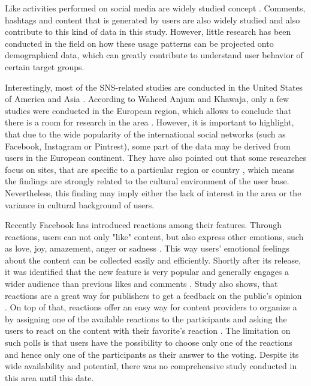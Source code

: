 Like activities performed on social media are widely studied concept \cite{bakhshi2014faces, jang2015noreciprocity, jang2016teensengagemorewithfewerphotos, ottoni2013ladies}. Comments, hashtags and content that is generated by users are also widely studied \cite{bakhshi2014faces, jang2016teensengagemorewithfewerphotos, hu2014we, bakhshi2014faces} and also contribute to this kind of data in this study. However, little research has been conducted in the field on how these usage patterns can be projected onto demographical data, which can greatly contribute to understand user behavior of certain target groups. 

Interestingly, most of the SNS-related studies are conducted in the United States of America and Asia \cite{waheed2017investigation}. According to Waheed
Anjum and Khawaja, only a few studies were conducted in the European region, which allows to conclude that there is a room for research in the area \cite{waheed2017investigation}. However, it is important to highlight, that due to the wide popularity of the international social networks (such as Facebook, Instagram or Pintrest), some part of the data may be derived from users in the European continent. They have also pointed out that some researches focus on sites, that are specific to a particular region or country \cite{waheed2017investigation}, which means the findings are strongly related to the cultural environment of the user base. Nevertheless, this finding may imply either the lack of interest in the area or the variance in cultural background of users. 

Recently Facebook has introduced reactions among their features. Through reactions, users can not only "like" content, but also express other emotions, such as love, joy, amazement, anger or sadness \cite{shouldfacebookusereactions, howarenewspublishersreactingonfacebook}. This way users' emotional feelings about the content can be collected easily and efficiently. Shortly after its release, it was identified that the new feature is very popular and generally engages a wider audience than previous likes and comments \cite{shouldfacebookusereactions}. Study also shows, that reactions are a great way for publishers to get a feedback on the public's opinion \cite{howarenewspublishersreactingonfacebook}. On top of that, reactions offer an easy way for content providers to organize a by assigning one of the available reactions to the participants and asking the users to react on the content with their favorite's reaction \cite{shouldfacebookusereactions}. The limitation on such polls is that users have the possibility to choose only one of the reactions and hence only one of the participants as their answer to the voting. Despite its wide availability and potential, there was no comprehensive study conducted in this area until this date.

